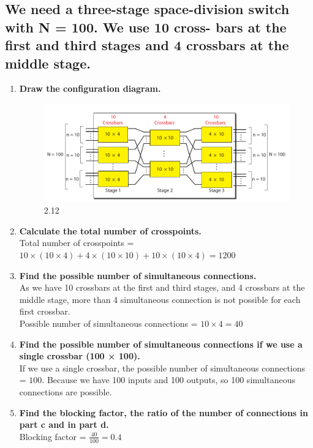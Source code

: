 \documentclass{article}
\begin{document}
\subsection{We need a three-stage space-division switch with N = 100. We use 10 cross-
	bars at the first and third stages and 4 crossbars at the middle stage.}

\begin{enumerate}
	\item \textbf{ Draw the configuration diagram. } \par
	      \begin{figure}[H]
		      \center
		      \includegraphics[scale=0.5]{8.1.png}
		      \caption{2.12}
	      \end{figure}
	\item \textbf{ Calculate the total number of crosspoints. } \\
	      Total number of crosspoints = $ 10 \times (10 \times 4) + 4 \times (10 \times 10) + 10 \times (10 \times 4) = 1200 $
	\item \textbf{ Find the possible number of simultaneous connections. } \\
	      As we have 10 crossbars at the first and third stages, and 4 crossbars at the middle stage,
	      more than 4 simultaneous connection is not possible for each first crossbar. \\
	      Possible number of simultaneous connections = $ 10 \times 4 = 40 $
	\item \textbf{ Find the possible number of simultaneous connections if we use a single crossbar (100 × 100). } \\
	      If we use a single crossbar, the possible number of simultaneous connections = $ 100 $.
	      Because we have 100 inputs and 100 outputs, so 100 simultaneous connections are possible.
	\item \textbf{ Find the blocking factor, the ratio of the number of connections in part c and in part d. } \\
	      Blocking factor = $ \frac{40}{100} = 0.4 $
\end{enumerate}
\end{document}
